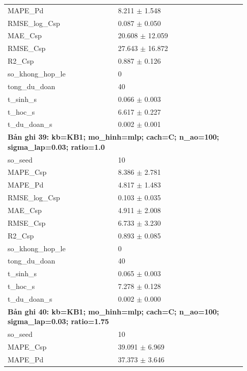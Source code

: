 \begin{longtable}{p{0.43\linewidth}p{0.50\linewidth}}
MAPE\_\allowbreak Pd & 8.211 $\pm$ 1.548 \\
RMSE\_\allowbreak log\_\allowbreak Csp & 0.087 $\pm$ 0.050 \\
MAE\_\allowbreak Csp & 20.608 $\pm$ 12.059 \\
RMSE\_\allowbreak Csp & 27.643 $\pm$ 16.872 \\
R2\_\allowbreak Csp & 0.887 $\pm$ 0.126 \\
so\_\allowbreak khong\_\allowbreak hop\_\allowbreak le & 0 \\
tong\_\allowbreak du\_\allowbreak doan & 40 \\
t\_\allowbreak sinh\_\allowbreak s & 0.066 $\pm$ 0.003 \\
t\_\allowbreak hoc\_\allowbreak s & 6.617 $\pm$ 0.227 \\
t\_\allowbreak du\_\allowbreak doan\_\allowbreak s & 0.002 $\pm$ 0.001 \\
\midrule
\multicolumn{2}{p{0.95\linewidth}}{\textbf{Bản ghi 39: kb=KB1; mo\_hinh=mlp; cach=C; n\_ao=100; sigma\_lap=0.03; ratio=1.0}} \\
so\_\allowbreak seed & 10 \\
MAPE\_\allowbreak Csp & 8.386 $\pm$ 2.781 \\
MAPE\_\allowbreak Pd & 4.817 $\pm$ 1.483 \\
RMSE\_\allowbreak log\_\allowbreak Csp & 0.103 $\pm$ 0.035 \\
MAE\_\allowbreak Csp & 4.911 $\pm$ 2.008 \\
RMSE\_\allowbreak Csp & 6.733 $\pm$ 3.230 \\
R2\_\allowbreak Csp & 0.893 $\pm$ 0.085 \\
so\_\allowbreak khong\_\allowbreak hop\_\allowbreak le & 0 \\
tong\_\allowbreak du\_\allowbreak doan & 40 \\
t\_\allowbreak sinh\_\allowbreak s & 0.065 $\pm$ 0.003 \\
t\_\allowbreak hoc\_\allowbreak s & 7.278 $\pm$ 0.128 \\
t\_\allowbreak du\_\allowbreak doan\_\allowbreak s & 0.002 $\pm$ 0.000 \\
\midrule
\multicolumn{2}{p{0.95\linewidth}}{\textbf{Bản ghi 40: kb=KB1; mo\_hinh=mlp; cach=C; n\_ao=100; sigma\_lap=0.03; ratio=1.75}} \\
so\_\allowbreak seed & 10 \\
MAPE\_\allowbreak Csp & 39.091 $\pm$ 6.969 \\
MAPE\_\allowbreak Pd & 37.373 $\pm$ 3.646 \\

\end{longtable}
